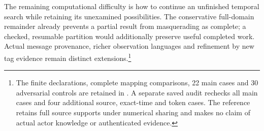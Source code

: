 The remaining computational difficulty is how to continue an unfinished temporal search while retaining its unexamined possibilities. The conservative full-domain remainder already prevents a partial result from masquerading as complete; a checked, resumable partition would additionally preserve useful completed work. Actual message provenance, richer observation languages and refinement by new tag evidence remain distinct extensions.\footnote{The finite declarations, complete mapping comparisons, 22 main cases and 30 adversarial controls are retained in . A separate saved audit rechecks all main cases and four additional source, exact-time and token cases. The reference retains full source supports under numerical sharing and makes no claim of actual actor knowledge or authenticated evidence.}
